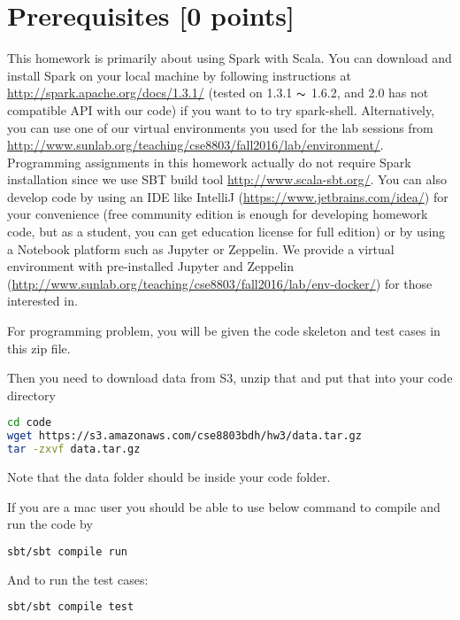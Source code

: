 \documentclass[12pt]{article}
\begin{document}
\section*{Prerequisites [0 points]}
This homework is primarily about using Spark with Scala. You can download and install Spark on your local machine by following instructions at \url{http://spark.apache.org/docs/1.3.1/} (tested on 1.3.1 $\thicksim$ 1.6.2, and 2.0 has not compatible API with our code) if you want to to try spark-shell. Alternatively, you can use one of our virtual environments you used for the lab sessions from \url{http://www.sunlab.org/teaching/cse8803/fall2016/lab/environment/}. Programming assignments in this homework actually do not require Spark installation since we use SBT build tool \url{http://www.scala-sbt.org/}. You can also develop code by using an IDE like IntelliJ (\url{https://www.jetbrains.com/idea/}) for your convenience (free community edition is enough for developing homework code, but as a student, you can get education license for full edition) or by using a Notebook platform such as Jupyter or Zeppelin. We provide a virtual environment with pre-installed Jupyter and Zeppelin (\url{http://www.sunlab.org/teaching/cse8803/fall2016/lab/env-docker/}) for those interested in.



For programming problem, you will be given the code skeleton and test cases in this zip file.

Then you need to download data from S3, unzip that and put that into your code directory
\begin{lstlisting}[frame=single,language=bash]
cd code
wget https://s3.amazonaws.com/cse8803bdh/hw3/data.tar.gz
tar -zxvf data.tar.gz
\end{lstlisting}
Note that the data folder should be inside your code folder. 

If you are a mac user you should be able to use below command to compile and run the code by
\begin{lstlisting}[frame=single,language=bash]
sbt/sbt compile run
\end{lstlisting}

And to run the test cases:
\begin{lstlisting}[frame=single,language=bash]
sbt/sbt compile test
\end{lstlisting}
\end{document}
